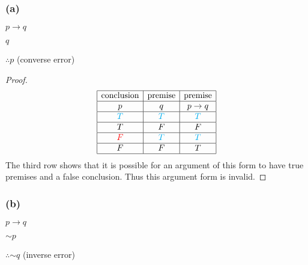 \documentclass[14pt]{extarticle}
\begin{document}
\subsubsection{(a)}
$p \to q$

$q$

$\therefore p$ (converse error)

\begin{proof}
    $$
        \begin{array}{|c|c|c|}
            \hline
            \text{conclusion} & \text{premise} & \text{premise} \\
            \hline
            p                 & q              & p \to q        \\
            \hline
            \color{cyan} T    & \color{cyan} T & \color{cyan} T \\
            \hline
            T                 & F              & F              \\
            \hline
            \color{red} F     & \color{cyan} T & \color{cyan} T \\
            \hline
            F                 & F              & T              \\
            \hline
        \end{array}
    $$
    The third row shows that it is possible for an argument of this form to have true premises and a false conclusion. Thus this argument form is invalid.
\end{proof}

\subsubsection{(b)}
$p \to q$

${\sim p}$

$\therefore {\sim q}$ (inverse error)
\end{document}
